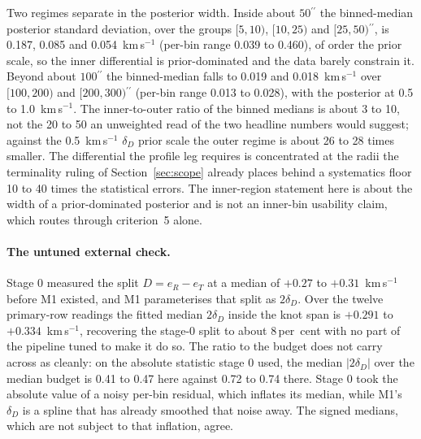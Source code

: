 \documentclass[11pt]{article}
\newcommand{\as}{\ensuremath{^{\prime\prime}}}
\newcommand{\dD}{\ensuremath{\delta_D}}
\begin{document}
Two regimes separate in the posterior width. Inside about $50\as$ the binned-median posterior standard deviation, over the groups $[5,10)$, $[10,25)$ and $[25,50)\as$, is 0.187, 0.085 and 0.054~km\,s$^{-1}$ (per-bin range 0.039 to 0.460), of order the prior scale, so the inner differential is prior-dominated and the data barely constrain it. Beyond about $100\as$ the binned-median falls to 0.019 and 0.018~km\,s$^{-1}$ over $[100,200)$ and $[200,300)\as$ (per-bin range 0.013 to 0.028), with the posterior at 0.5 to 1.0~km\,s$^{-1}$. The inner-to-outer ratio of the binned medians is about 3 to 10, not the 20 to 50 an unweighted read of the two headline numbers would suggest; against the 0.5~km\,s$^{-1}$ \dD{} prior scale the outer regime is about 26 to 28 times smaller. The differential the profile leg requires is concentrated at the radii the terminality ruling of Section~\ref{sec:scope} already places behind a systematics floor 10 to 40 times the statistical errors. The inner-region statement here is about the width of a prior-dominated posterior and is not an inner-bin usability claim, which routes through criterion~5 alone.

\paragraph{The untuned external check.} Stage 0 measured the split $D = e_R - e_T$ at a median of $+0.27$ to $+0.31$~km\,s$^{-1}$ before M1 existed, and M1 parameterises that split as $2\dD$. Over the twelve primary-row readings the fitted median $2\dD$ inside the knot span is $+0.291$ to $+0.334$~km\,s$^{-1}$, recovering the stage-0 split to about 8\,per~cent with no part of the pipeline tuned to make it do so. The ratio to the budget does not carry across as cleanly: on the absolute statistic stage 0 used, the median $|2\dD|$ over the median budget is 0.41 to 0.47 here against 0.72 to 0.74 there. Stage 0 took the absolute value of a noisy per-bin residual, which inflates its median, while M1's \dD{} is a spline that has already smoothed that noise away. The signed medians, which are not subject to that inflation, agree.
\end{document}
